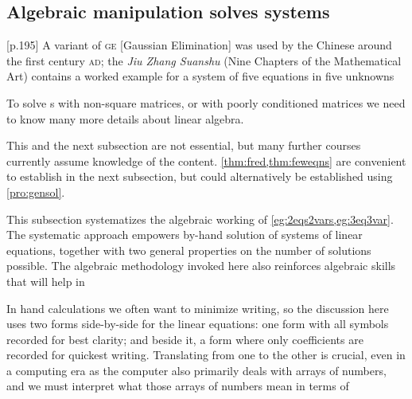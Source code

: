 







\subsection{Algebraic manipulation solves systems}
\label{sec:amss}

\begin{quoted}{\cite{Higham1996} [p.195]}
A variant of \textsc{ge} [Gaussian Elimination] was used by the Chinese around the first century \textsc{ad}; the \emph{Jiu Zhang Suanshu} (Nine Chapters of the Mathematical Art) contains a worked example for a system of five equations in five unknowns
\end{quoted}

To solve s with non-square matrices, or with poorly conditioned matrices we need to know many more details about linear algebra.

This and the next subsection are not essential, but many further courses currently assume knowledge of the content. 
\cref{thm:fred,thm:feweqns} are convenient to establish in the next subsection, but could alternatively be established using \cref{pro:gensol}. 

This subsection systematizes the algebraic working of \cref{eg:2eqs2vars,eg:3eq3var}.
The systematic approach empowers by-hand solution of systems of linear equations, together with two general properties on the number of solutions possible.
The algebraic methodology invoked here also reinforces algebraic skills that will help in 

In hand calculations we often want to minimize writing, so the discussion here uses two forms side-by-side for the linear equations: one form with all symbols recorded for best clarity; and beside it, a form where only coefficients are recorded for quickest writing.
Translating from one to the other is crucial, even in a computing era as the computer also primarily deals with arrays of numbers, and we must interpret what those arrays of numbers mean in terms of 

